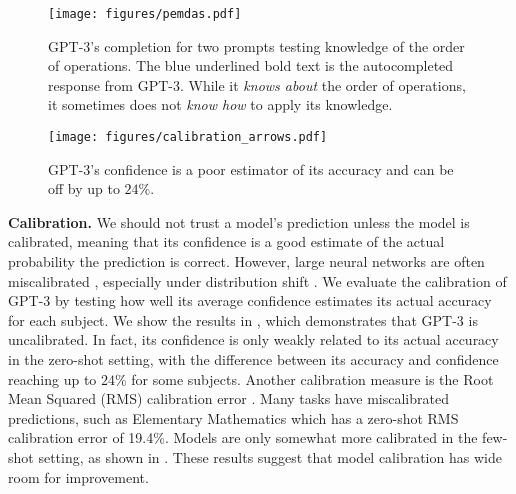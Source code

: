 \begin{figure}
\vspace{-20pt}
\begin{minipage}{.5\textwidth}
\centering
\texttt{[image: figures/pemdas.pdf]}
\caption{GPT-3's completion for two prompts testing knowledge of the order of operations.
The \textcolor{rightblue}{blue} underlined bold text is the autocompleted response from GPT-3.
While it \emph{knows about} the order of operations, it sometimes does not \emph{know how} to apply its knowledge.}\label{fig:pemdas}
\end{minipage}%
\begin{minipage}{.5\textwidth}
\centering
\texttt{[image: figures/calibration\_arrows.pdf]}
\caption{
GPT-3's confidence is a poor estimator of its accuracy and can be off by up to $24\%$.
}\label{fig:calibration}
\end{minipage}
\vspace{-15pt}
\end{figure}

\noindent\textbf{Calibration.}\quad
We should not trust a model's prediction unless the model is calibrated, meaning that its confidence is a good estimate of the actual probability the prediction is correct. However, large neural networks are often miscalibrated \citep{kilian2017calibration}, especially under distribution shift \citep{ovadia2019can}. 
We evaluate the calibration of GPT-3 by testing how well its average confidence estimates its actual accuracy for each subject.
We show the results in , which demonstrates that GPT-3 is uncalibrated. In fact, its confidence is only weakly related to its actual accuracy in the zero-shot setting, with the difference between its accuracy and confidence reaching up to $24\%$ for some subjects.
Another calibration measure is the Root Mean Squared (RMS) calibration error \citep{hendrycks2019oe,kumar2019verifiedcalibration}. Many tasks have miscalibrated predictions, such as Elementary Mathematics which has a zero-shot RMS calibration error of 19.4\%. Models are only somewhat more calibrated in the few-shot setting, as shown in .
These results suggest that model calibration has wide room for improvement.


